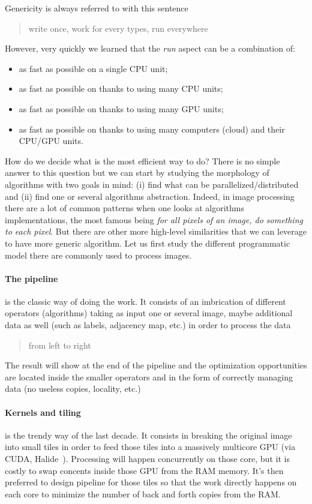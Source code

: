 Genericity is always referred to with this sentence \blockquote{write once, work for every types, run everywhere}.
However, very quickly we learned that the \emph{run} aspect can be a combination of:
\begin{itemize}
  \item as fast as possible on a single CPU unit;
  \item as fast as possible on thanks to using many CPU units;
  \item as fast as possible on thanks to using many GPU units;
  \item as fast as possible on thanks to using many computers (cloud) and their CPU/GPU units.
\end{itemize}
How do we decide what is the most efficient way to do? There is no simple answer to this question but we can start by
studying the morphology of algorithms with two goals in mind: (i) find what can be parallelized/distributed and (ii)
find one or several algorithms abstraction. Indeed, in image processing there are a lot of common patterns when one
looks at algorithms implementations, the most famous being \emph{for all pixels of an image, do something to each
  pixel}. But there are other more high-level similarities that we can leverage to have more generic algorithm. Let us
first study the different programmatic model there are commonly used to process images.

\paragraph{The pipeline} is the classic way of doing the work. It consists of an imbrication of different operators
(algorithms) taking as input one or several image, maybe additional data as well (such as labels, adjacency map, etc.)
in order to process the data \blockquote{from left to right}. The result will show at the end of the pipeline and the
optimization opportunities are located inside the smaller operators and in the form of correctly managing data (no
useless copies, locality, etc.)

\paragraph{Kernels and tiling} is the trendy way of the last decade. It consists in breaking the original image into
small tiles in order to feed those tiles into a massively multicore GPU (via CUDA,
Halide~\parencite{ragankelley.2013.halide}). Processing will happen concurrently on those core, but it is costly to swap
concents inside those GPU from the RAM memory. It's then preferred to design pipeline for those tiles so that the work
directly happens on each core to minimize the number of back and forth copies from the RAM.

